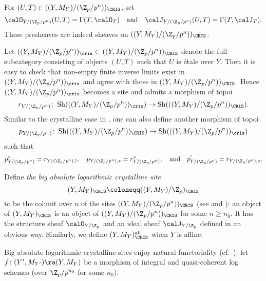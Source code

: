 \begin{defn}
For $(U,T)\in ((Y,M_Y)/(\Z_p/p^n))_\CRIS$, set
\[
\calO_{Y/(\Z_p/p^n)}(U,T)=\Gamma(T,\calO_T) \quad\text{and}\quad
\calJ_{Y/(\Z_p/p^n)}(U,T)=\Gamma(T,\calJ_T).
\]
These presheaves are indeed sheaves on $((Y,M_Y)/(\Z_p/p^n))_\CRIS$.
\end{defn}

\begin{rem}
Let $((Y,M_Y)/(\Z_p/p^n))_\cris\subset ((Y,M_Y)/(\Z_p/p^n))_\CRIS$ denote the full subcategory consisting of objects $(U,T)$ such that $U$ is \'etale over $Y$. Then it is easy to check that non-empty finite inverse limits exist in $((Y,M_Y)/(\Z_p/p^n))_\cris$ and agree with those in $((Y,M_Y)/(\Z_p/p^n))_\CRIS$.
Hence $((Y,M_Y)/(\Z_p/p^n))_\cris$ becomes a site and admits a morphism of topoi 
\[r_{Y/(\Z_p/p^n)}\colon \operatorname{Sh}(((Y,M_Y)/(\Z_p/p^n))_\cris)\rightarrow \operatorname{Sh}(((Y,M_Y)/(\Z_p/p^n))_\CRIS).
\]
Similar to the crystalline case in \cite[III.4.1.3]{Berthelot-book}, one can also define another morphism of topoi 
\[
p_{Y/(\Z_p/p^n)}\colon \operatorname{Sh}(((Y,M_Y)/(\Z_p/p^n))_\CRIS)\rightarrow \operatorname{Sh}(((Y,M_Y)/(\Z_p/p^n))_\cris)
\]
such that 
\[
p_{Y/(\Z_p/p^n)}^\ast=r_{Y/(\Z_p/p^n),!},\quad
p_{Y/(\Z_p/p^n),\ast}=r_{Y/(\Z_p/p^n)}^\ast,\quad\text{and}\quad
p_{Y/(\Z_p/p^n)}^!=r_{Y/(\Z_p/p^n),\ast}.
\]
\end{rem}

\begin{defn}\label{def:big absolute log crystallien site}
Define \emph{the big absolute logarithmic crystalline site} 
\[
(Y,M_Y)_\CRIS\coloneqq ((Y,M_Y)/\Z_p)_\CRIS
\]
to be the colimit over $n$ of the sites $((Y,M_{Y})/(\Z_p/p^n))_\CRIS$ (see \cite[Tag~0EXI]{stacks-project} and \cite[1.12]{Beilinson-crystalline-period-map}): an object of $(Y,M_Y)_\CRIS$ is an object of $((Y,M_Y)/(\Z_p/p^n))_\CRIS$ for some $n\geq n_0$.
It has the structure sheaf $\calO_{Y/\Z_p}$ and an ideal sheaf $\calJ_{Y/\Z_p}$ defined in an obvious way. Similarly, we define $(Y,M_Y)_{\CRIS}^{\mathrm{aff}}$ when $Y$ is affine.
\end{defn}


Big absolute logarithmic crystalline sites enjoy natural functoriality (cf.~\cite[III.4.2]{Berthelot-book}):
let $f\colon (Y',M_{Y'})\ra (Y,M_Y)$ be a morphism of integral and quasi-coherent log schemes (over $\Z_p/p^{n_0}$ for some $n_0$).

